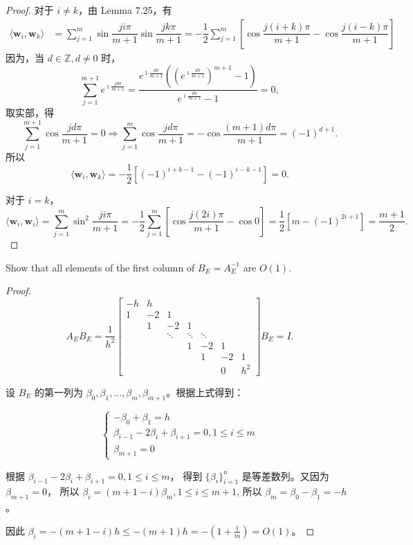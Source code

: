 \documentclass[lang=cn,a4paper,newtx,bibend=bibtex]{elegantpaper}
\newcommand{\wB}{\bm{w}}
\newcommand{\indot}[2]{\langle {#1}, {#2} \rangle}
\begin{document}
\begin{proof}
  对于 $i \neq k$，由 Lemma 7.25，有
  \begin{equation*}
  \begin{aligned}
    \indot{\wB_i}{\wB_k} &= \sum_{j = 1}^m \sin \dfrac{ji\pi}{m+1} \sin \dfrac{jk\pi}{m+1} = -\dfrac12 \sum_{j = 1}^m \left[\cos \dfrac{j(i+k)\pi}{m+1} - \cos \dfrac{j(i -k)\pi}{m+1}\right]
  \end{aligned}
  \end{equation*}
  因为，当 $d\in \mathbb{Z}, d\neq 0$ 时，
  \[\sum_{j =1}^{m+1} e^{\imath\frac{jd\pi}{m+1}} = \dfrac{e^{\imath\frac{d\pi}{m+1}} \left(\left(e^{\imath\frac{d\pi}{m+1}}\right)^{m+1} - 1\right)}{e^{\imath\frac{d\pi}{m+1}} - 1} = 0,\]
  取实部，得
  \[\sum_{j=1}^{m+1} \cos \dfrac{jd\pi}{m+1} = 0 \Rightarrow \sum_{j = 1}^m \cos \dfrac{jd\pi}{m+1} = - \cos \dfrac{(m+1)d\pi}{m+1} = (-1)^{d+1}.\]
  所以
  \[\indot{\wB_i}{\wB_k} = -\dfrac12 [(-1)^{i+k-1} - (-1)^{i-k-1}] = 0.\]

  对于 $i = k$，
  \[\indot{\wB_i}{\wB_i} = \sum_{j = 1}^{m} \sin^2 \dfrac{ji\pi}{m+1} = -\dfrac12 \sum_{j = 1}^m \left[\cos \dfrac{j(2i)\pi}{m+1} - \cos 0 \right]= \frac12 [m - (-1)^{2i+1}] = \dfrac{m + 1}{2}. \]

\end{proof}

\begin{prob}[Exercise 7.37]
  Show that all elements of the first column of $B_E = A_E^{-1}$ are $O(1)$.
\end{prob}

\begin{proof}
\[A_EB_E = \dfrac1{h^2}\begin{bmatrix}
  -h & h & & & & & \\
  1 & -2 & 1 & & & & \\
  & 1 & -2 & 1 & & & \\
  & & \ddots & \ddots & \ddots & & \\
  & & & 1 & -2 & 1 & \\
  & & & & 1 & -2 & 1 \\
  & & & & & 0 & h^2 
\end{bmatrix}B_E= I.\]

设 $B_E$ 的第一列为 $\beta_0, \beta_1, \dots, \beta_m, \beta_{m + 1}$。根据上式得到：

\[
\begin{cases}
  -\beta_0 + \beta_1 = h \\
  \beta_{i-1} - 2\beta_i + \beta_{i+1} = 0, 1 \le i \le m\\
  \beta_{m + 1} = 0
\end{cases}
\]

根据 $\beta_{i-1} - 2\beta_i + \beta_{i+1} = 0, 1 \le i \le m$，
得到 $\{\beta_i\}_{i=1}^{n}$ 是等差数列。又因为 $\beta_{m+1} = 0$，
所以 $\beta_i = (m + 1 - i)\beta_m, 1\le i \le m+1$,
所以 $\beta_m = \beta_0 - \beta_1 = -h$。

因此 $\beta_i = -(m +1-i) h \le -(m + 1) h = -(1 + \frac1m) = O(1)$。
\end{proof}
\end{document}
